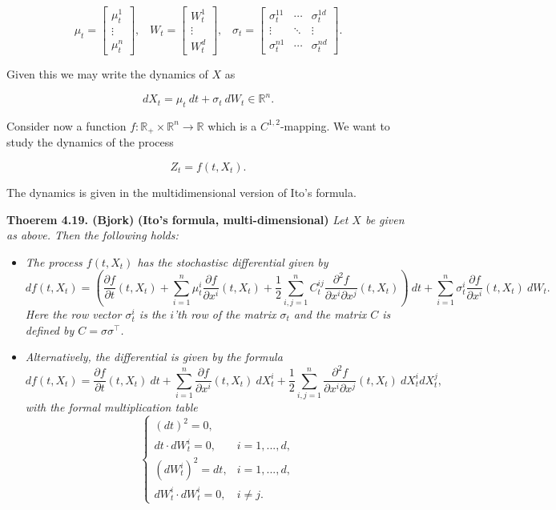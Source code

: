 \documentclass[a4paper,10pt,openany]{book}
\providecommand{\tightlist}{%
 \setlength{\itemsep}{0pt}\setlength{\parskip}{0pt}}
\begin{document}
\[
\mu_t=\begin{bmatrix}\mu^1_t\\ \vdots\\ \mu^n_t\end{bmatrix},\hspace{10pt}W_t=\begin{bmatrix}W^1_t\\ \vdots\\ W^d_t\end{bmatrix},\hspace{10pt}\sigma_t=\begin{bmatrix}\sigma^{11}_t & \cdots & \sigma^{1d}_t \\ \vdots & \ddots & \vdots\\ \sigma^{n1}_t &\cdots& \sigma^{nd}_t\end{bmatrix}.
\]

Given this we may write the dynamics of \(X\) as

\[
d X_t=\mu_t\ dt+\sigma_t\ dW_t\in\mathbb{R}^n.
\]

Consider now a function \(f:\mathbb{R}_+\times \mathbb{R}^n\to\mathbb{R}\) which is a \(C^{1,2}\)-mapping. We want to study the dynamics of the process

\[
Z_t=f(t,X_t).
\]

The dynamics is given in the multidimensional version of Ito's formula.

\textbf{Thoerem 4.19. (Bjork)} \textbf{(Ito's formula, multi-dimensional)} \emph{Let \(X\) be given as above. Then the following holds:}

\begin{itemize}
\tightlist
\item
  \emph{The process \(f(t,X_t)\) has the stochastisc differential given by}
  \[
    df(t,X_t)=\left(\frac{\partial f}{\partial t}(t,X_t) + \sum_{i=1}^n\mu^i_t\frac{\partial f}{\partial x^i}(t,X_t) + \frac{1}{2}\sum_{i,j=1}^nC_t^{ij}\frac{\partial^2 f}{\partial x^i\partial x^j}(t,X_t)\right)\ dt+\sum_{i=1}^n\sigma^i_t\frac{\partial f}{\partial x^i}(t,X_t)\ dW_t.
    \]
  \emph{Here the row vector \(\sigma^i_t\) is the \(i\)'th row of the matrix \(\sigma_t\) and the matrix \(C\) is defined by \(C=\sigma\sigma^\top\).}
\item
  \emph{Alternatively, the differential is given by the formula}
  \[
    df(t,X_t)=\frac{\partial f}{\partial t}(t,X_t)\ dt + \sum_{i=1}^n\frac{\partial f}{\partial x^i}(t,X_t)\ dX^i_t + \frac{1}{2}\sum_{i,j=1}^n\frac{\partial^2 f}{\partial x^i\partial x^j}(t,X_t)\ dX^i_tdX^j_t,
    \]
  \emph{with the formal multiplication table}
  \[
    \left\{\begin{matrix}(dt)^2=0,\\  dt\cdot dW_t^i=0, & i = 1,...,d,\\ (dW_t^i)^2=dt, & i=1,...,d, \\ dW_t^i\cdot dW_t^i =0, & i\ne j.\end{matrix}\right.
    \]
\end{itemize}
\end{document}
